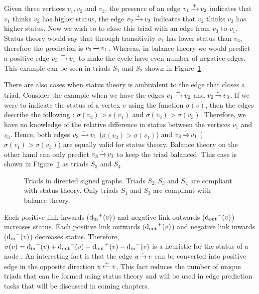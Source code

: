 Given three vertices $v_1,v_2$ and $v_3$, the presence of an edge $v_1 \operatorname*{\xrightarrow{+}} v_2$ indicates that $v_1$ thinks $v_2$ has higher status, the edge $v_2 \operatorname*{\xrightarrow{+}} v_3$ indicates that $v_2$ thinks $v_3$ has higher status.
Now we wish to to close this triad with an edge from $v_3$ to $v_1$.
Status theory would say that through transitivity $v_1$ has lower status than $v_3$, therefore the prediction is $v_3 \operatorname*{\xrightarrow{-}} v_1$.
Whereas, in balance theory we would predict a positive edge $v_3 \operatorname*{\xrightarrow{+}} v_1$ to make the cycle have even number of negative edges.
This example can be seen in triads $S_1$ and $S_2$ shown in Figure~\ref{fig:status-triads}.

There are also cases when status theory is ambivalent to the edge that closes a triad.
Consider the example when we have the edges $v_1 \operatorname*{\xrightarrow{+}} v_2$ and $v_2 \operatorname*{\xrightarrow{-}} v_3$.
If we were to indicate the status of a vertex $v$ using the function $\sigma(v)$, then the edges describe the following : $\sigma(v_2)>s(v_1) $ and $\sigma(v_2)>\sigma(v_3)$.
Therefore, we have no knowledge of the relative difference in status between the vertices $v_1$ and $v_3$.
Hence, both edges $v_3 \operatorname*{\xrightarrow{+}} v_1$ ($\sigma(v_3) > \sigma(v_1)$) and $v_3 \operatorname*{\xrightarrow{-}} v_1$ ($\sigma(v_1) > \sigma(v_3)$) are equally valid for status theory.
Balance theory on the other hand can only predict $v_3 \operatorname*{\xrightarrow{-}} v_1$ to keep the triad balanced.
This case is shown in Figure~\ref{fig:status-triads} as triads $S_3$ and $S_4$.

\begin{figure}[!ht] 
    \centering
    
    \caption{Triads in directed signed graphs. Triads $S_2,S_3$ and $S_4$ are compliant with status theory. Only triads $S_1$ and $S_3$ are compliant with balance theory.}
    \label{fig:status-triads}
\end{figure}

Each positive link inwards ($\operatorname*{d_{\text{in}}}^{+}(v)$) and negative link outwards ($\operatorname*{d_{\text{out}}}^{-}(v)$) increases status.
Each positive link outwards ($\operatorname*{d_{\text{out}}}^{+}(v)$) and negative link inwards ($\operatorname*{d_{\text{in}}}^{-}(v)$) decreases status.
Therefore, $\sigma(v) = \operatorname*{d_{\text{in}}}^{+}(v) + \operatorname*{d_{\text{out}}}^{-}(v) - \operatorname*{d_{\text{out}}}^{+}(v)- \operatorname*{d_{\text{in}}}^{-}(v)$ is a heuristic for the status of a node \cite{leskovec2010predicting}.
An interesting fact is that the edge $u \operatorname*{\xrightarrow{-}} v$ can be converted into positive edge in the opposite direction $u \operatorname*{\xleftarrow{+}} v$.
This fact reduces the number of unique triads that can be formed using status theory and will be used in edge prediction tasks that will be discussed in coming chapters.

